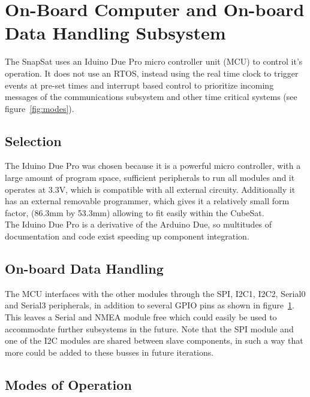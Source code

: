 \section{On-Board Computer and On-board Data Handling Subsystem}

The SnapSat uses an Iduino Due Pro micro controller unit (MCU) to control it's operation.  It does not use an RTOS, instead using the real time clock to trigger events at pre-set times and interrupt based control to prioritize incoming messages of the communications subsystem and other time critical systems (see figure~\ref{fig:modes}).

\subsection{Selection}

The Iduino Due Pro was chosen because it is a powerful micro controller, with a large amount of program space, sufficient peripherals to run all modules and it operates at 3.3V, which is compatible with all external circuity. Additionally it has an external removable programmer, which gives it a relatively small form factor, (86.3mm by 53.3mm) allowing to fit easily within the CubeSat. \\
The Iduino Due Pro is a derivative of the Arduino Due, so multitudes of documentation and code exist speeding up component integration.

\subsection{On-board Data Handling}

The MCU interfaces with the other modules through the SPI, I2C1, I2C2, Serial0 and Serial3 peripherals, in addition to several GPIO pins as shown in figure~\ref{fig:mcucon}.  This leaves a Serial and NMEA module free which could easily be used to accommodate further subsystems in the future.  Note that the SPI module and one of the I2C modules are shared between slave components, in such a way that more could be added to these busses in future iterations.

\begin{figure}[H]
	\label{fig:mcucon}
\end{figure}

\subsection{Modes of Operation}

